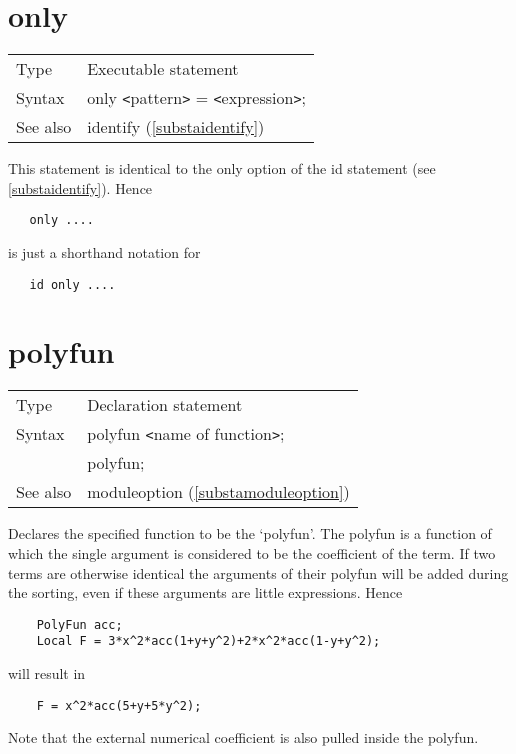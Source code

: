  
\section{only}
\label{substaonly}

\noindent \begin{tabular}{ll}
Type & Executable statement\\
Syntax & only {\tt<}pattern{\tt>} = {\tt<}expression{\tt>};
\\ See also & identify (\ref{substaidentify})
\end{tabular} \vspace{4mm}

\noindent This statement is identical to the only option of the 
id statement (see \ref{substaidentify}). Hence
\begin{verbatim}
   only ....
\end{verbatim}
is just a shorthand notation for
\begin{verbatim}
   id only ....
\end{verbatim}
\vspace{10mm}


\section{polyfun}
\label{substapolyfun}

\noindent \begin{tabular}{ll}
Type & Declaration statement\\
Syntax & polyfun {\tt<}name of function{\tt>}; \\
       & polyfun;
\\ See also & moduleoption (\ref{substamoduleoption})
\end{tabular}\vspace{4mm}

\noindent Declares the specified function to be the 
`polyfun'. The polyfun is a function of which the single 
argument is considered to be the 
coefficient of the term. If two terms are otherwise 
identical the arguments of their polyfun will be added during the sorting, 
even if these arguments are little expressions. Hence
\begin{verbatim}
    PolyFun acc;
    Local F = 3*x^2*acc(1+y+y^2)+2*x^2*acc(1-y+y^2);
\end{verbatim}
will result in
\begin{verbatim}
    F = x^2*acc(5+y+5*y^2);
\end{verbatim}
Note that the external numerical coefficient is also 
pulled inside the polyfun.

